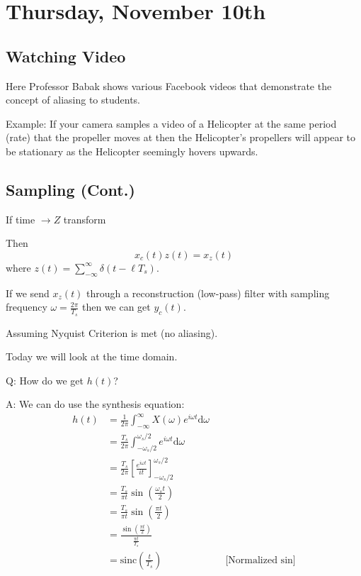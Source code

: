 \section{Thursday, November 10th}
\subsection{Watching Video}
Here Professor Babak shows various Facebook videos that demonstrate the concept of aliasing to students.

Example: If your camera samples a video of a Helicopter at the same period (rate) that the propeller moves at then the Helicopter's propellers will appear to be stationary as the Helicopter seemingly hovers upwards.

\subsection{Sampling (Cont.)}
If time $\to Z$ transform

Then 
\[
    x_c(t) z(t) = x_z(t)
\]
where $z(t)=\sum_{-\infty}^\infty \delta(t-\ell T_s)$.

If we send $x_z(t)$ through a reconstruction (low-pass) filter with sampling frequency $\omega=\frac{2\pi}{T_s}$ then we can get $y_c(t)$.

Assuming Nyquist Criterion is met (no aliasing).

Today we will look at the time domain.
\begin{shaded}
Q: How do we get $h(t)$?
\end{shaded}
A: We can do use the synthesis equation:
\begin{align*}
    h(t)
    &=\frac1{2\pi}\int_{-\infty}^\infty X(\omega) e^{i\omega t} \mathrm d \omega
    \\
    &=\frac{T_s}{2\pi}\int_{-\omega_s/2}^{\omega_s/2} e^{i\omega t} \mathrm d \omega
    \\
    &=\frac{T_s}{2\pi}
    \left[
    \frac{e^{i\omega t}}{it}
    \right]_{-\omega_s/2}^{\omega_s/2}
    \\
    &=\frac{T_s}{\pi t}
    \sin\left(\frac{\omega_s t}{2}\right)
    \\
    &=\frac{T_s}{\pi t}
    \sin\left(\frac{\pi t}{2}\right)
    \\
    &=\frac{\sin\left(\frac{\pi t}{2}\right)}{\frac{\pi t}{T_s}}
    \\
    &=\text{sinc}\left(\frac t{T_s}\right)
    &&\text{[Normalized $\sin$]}
\end{align*}

